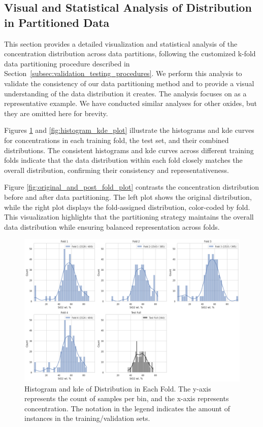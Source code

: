 \subsection{Visual and Statistical Analysis of  Distribution in Partitioned Data}\label{sec:visual_analysis}
This section provides a detailed visualization and statistical analysis of the  concentration distribution across data partitions, following the customized k-fold data partitioning procedure described in Section~\ref{subsec:validation_testing_procedures}.
We perform this analysis to validate the consistency of our data partitioning method and to provide a visual understanding of the data distribution it creates.
The analysis focuses on  as a representative example.
We have conducted similar analyses for other oxides, but they are omitted here for brevity.

Figures \ref{fig:histogram_grid_plot} and \ref{fig:histogram_kde_plot} illustrate the histograms and \gls{kde} curves for  concentrations in each training fold, the test set, and their combined distributions.
The consistent histograms and \gls{kde} curves across different training folds indicate that the data distribution within each fold closely matches the overall distribution, confirming their consistency and representativeness.

Figure \ref{fig:original_and_post_fold_plot} contrasts the  concentration distribution before and after data partitioning.
The left plot shows the original distribution, while the right plot displays the fold-assigned distribution, color-coded by fold.
This visualization highlights that the partitioning strategy maintains the overall data distribution while ensuring balanced representation across folds.

\begin{figure}[h!]
    \centering
    \includegraphics[width=\textwidth]{images/histogram_grid_plot.png}
    \caption{Histogram and \gls{kde} of  Distribution in Each Fold. The y-axis represents the count of samples per bin, and the x-axis represents  concentration. The notation in the legend indicates the amount of instances in the training/validation sets.}
    \label{fig:histogram_grid_plot}
\end{figure}

